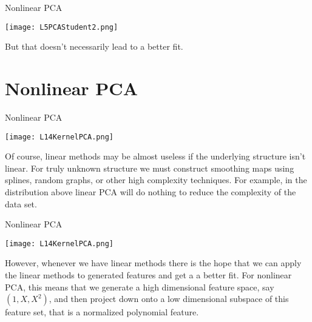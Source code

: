 \documentclass[10pt, table, dvipsnames,xcdraw,handout]{beamer}
\begin{document}
\begin{frame}[fragile]{Nonlinear PCA}
  \begin{minipage}[t][0.7\textheight][t]{\textwidth}
	\centering \texttt{[image: L5PCAStudent2.png]} 
  \end{minipage}
  \vfill
\begin{minipage}[t][0.3\textheight][t]{\textwidth}
But that doesn't necessarily lead to a better fit.
\end{minipage}
\end{frame}




\section{Nonlinear PCA}

\begin{frame}[fragile]{Nonlinear PCA}
  \begin{minipage}[t][0.5\textheight][t]{\textwidth}
	\centering \texttt{[image: L14KernelPCA.png]} 
  \end{minipage}
  \vfill
\begin{minipage}[t][0.5\textheight][t]{\textwidth}
Of course, linear methods may be almost useless if the underlying structure isn't linear. For truly unknown structure we must construct smoothing maps using splines, random graphs, or other high complexity techniques. \pause For example, in the distribution above linear PCA will do nothing to reduce the complexity of the data set. 
\end{minipage}
\end{frame}


\begin{frame}[fragile]{Nonlinear PCA}
  \begin{minipage}[t][0.5\textheight][t]{\textwidth}
	\centering \texttt{[image: L14KernelPCA.png]} 
  \end{minipage}
  \vfill
\begin{minipage}[t][0.5\textheight][t]{\textwidth}
However, whenever we have linear methods there is the hope that we can apply the linear methods to generated features and get a a better fit. For nonlinear PCA, this means that we generate a high dimensional feature space, say $(1,X,X^2)$, and then project down onto a low dimensional subspace of this feature set, that is a normalized polynomial feature. 
\end{minipage}
\end{frame}
\end{document}
